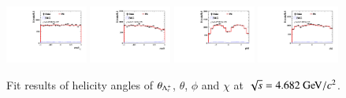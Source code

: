 \begin{figure}[H]\centering
    \includegraphics[width=0.24\textwidth]{figure/polarimetery/angular_plots/pkpi_4680_cos_theta0.pdf}
    \includegraphics[width=0.24\textwidth]{figure/polarimetery/angular_plots/pkpi_4680_cos_theta1.pdf}
    \includegraphics[width=0.24\textwidth]{figure/polarimetery/angular_plots/pkpi_4680_phi1.pdf}
    \includegraphics[width=0.24\textwidth]{figure/polarimetery/angular_plots/pkpi_4680_phi2.pdf}
    \caption{Fit results of helicity angles of $\theta_{\Lambda_{c}^{+}}$, $\theta$, $\phi$ and $\chi$ at $\sqrt{s} = 4.682\gev/c^2$.}
\label{fig:fit_angular_s5}
\end{figure}

